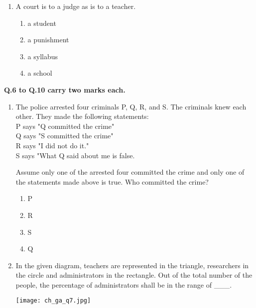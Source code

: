 \documentclass[12pt]{article}
\begin{document}
\begin{enumerate}[label=Q.\arabic*]
	\item A court is to a judge as \underline{\hspace{2cm}} is to a teacher.
		\begin{multicols}{2}
			\begin{enumerate}[label=(\Alph*)]
				\item a student
				\item a punishment
				\item a syllabus
				\item a school
			\end{enumerate}
		\end{multicols}
\end{enumerate}

\textbf{Q.6 to Q.10 carry two marks each.}

\begin{enumerate}[label=\textbf{Q.\arabic*}., start=6, leftmargin=*]
	\item The police arrested four criminals  P, Q, R, and S. The criminals knew each other. They made the following statements:\\
		\quad P says "Q committed the crime"\\
		\quad Q says "S committed the crime"\\
		\quad R says "I did not do it."\\
		\quad S says "What Q said about me is false.

		Assume only one of the arrested four committed the crime and only one of the statements made above is true. Who committed the crime?
		\begin{multicols}{2}
			\begin{enumerate}[label=(\Alph*)]
				\item P
				\item R
				\item S
				\item Q
			\end{enumerate}
		\end{multicols}

	\item In the given diagram, teachers are represented in the triangle, researchers in the circle and administrators in the rectangle. Out of the total number of the people, the percentage of administrators shall be in the range of \_\_\_.

		\begin{center}
			{
				\texttt{[image: ch\_ga\_q7.jpg]}
			}
		\end{center}


\end{enumerate}
\end{document}
